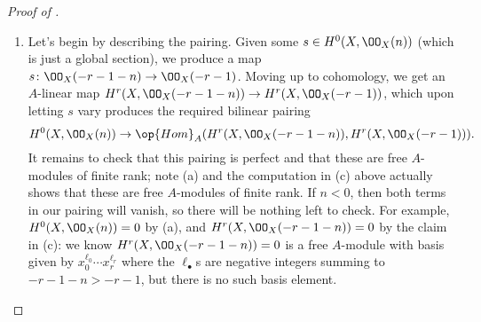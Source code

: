 \documentclass[../notes.tex]{subfiles}
\begin{document}
\begin{proof}[Proof of ]
\begin{enumerate}[label=(\alph*)]
		So it remains to show the claim. Well, looking at our \v Cech complex,
		\[\check H^r(\mc U,\mc F)=\coker\Bigg(\prod_jS_{x_0\cdots\widehat x_j\cdots x_r}\stackrel{d^{r-1}}\to S_{x_0\cdots x_r}\Bigg).\]
		Now, $S_{x_0\cdots x_r}$ is a free $A$-module with basis given by terms of the form $x_0^{\ell_0}\cdots x_r^{\ell_r}$ where $\ell_0,\ldots,\ell_r\in\ZZ$, so we want the cokernel to kill all undesired terms. Well, tracking through $d^{r-1}$, we find that it is just inclusion (up to sign), so the image is the free $A$-module with basis given by terms of the form $x_0^{\ell_0}\cdots x_r^{\ell_r}$ with at least one nonnegative exponent, so the claim follows.

		\item Let's begin by describing the pairing. Given some $s\in H^0(X,\OO_X(n))$ (which is just a global section), we produce a map $s\colon\OO_X(-r-1-n)\to\OO_X(-r-1)$. Moving up to cohomology, we get an $A$-linear map $H^r(X,\OO_X(-r-1-n))\to H^r(X,\OO_X(-r-1))$, which upon letting $s$ vary produces the required bilinear pairing
		\[H^0(X,\OO_X(n))\to\op{Hom}_A(H^r(X,\OO_X(-r-1-n)),H^r(X,\OO_X(-r-1))).\]
		It remains to check that this pairing is perfect and that these are free $A$-modules of finite rank; note (a) and the computation in (c) above actually shows that these are free $A$-modules of finite rank. If $n<0$, then both terms in our pairing will vanish, so there will be nothing left to check. For example, $H^0(X,\OO_X(n))=0$ by (a), and $H^r(X,\OO_X(-r-1-n))=0$ by the claim in (c): we know $H^r(X,\OO_X(-r-1-n))=0$ is a free $A$-module with basis given by $x_0^{\ell_0}\cdots x_r^{\ell_r}$ where the $\ell_\bullet$s are negative integers summing to $-r-1-n>-r-1$, but there is no such basis element.


\end{enumerate}
\end{proof}
\end{document}
